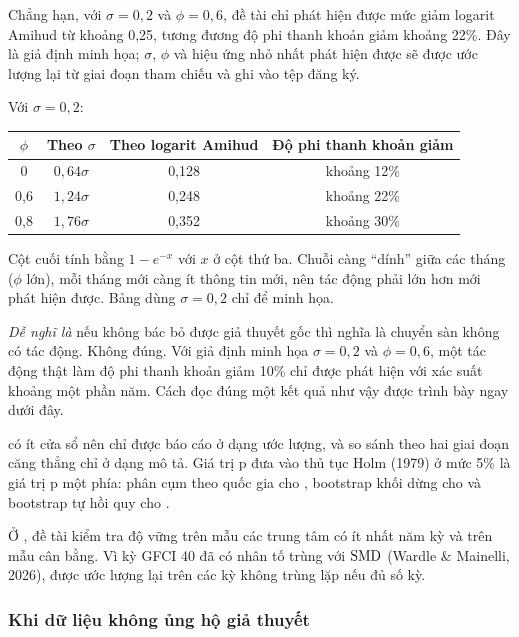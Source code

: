 Chẳng hạn, với $\sigma = 0{,}2$ và $\phi = 0{,}6$, đề tài chỉ phát hiện được mức giảm logarit Amihud từ khoảng 0,25, tương đương độ phi thanh khoản giảm khoảng 22\%. Đây là giả định minh họa; $\sigma$, $\phi$ và hiệu ứng nhỏ nhất phát hiện được sẽ được ước lượng lại từ giai đoạn tham chiếu và ghi vào tệp đăng ký.

\begin{vidu}
Với $\sigma = 0{,}2$:
\begin{center}
\begin{tabular}{@{}cccc@{}}
\toprule
$\phi$ & Theo $\sigma$ & Theo logarit Amihud & Độ phi thanh khoản giảm\\
\midrule
0 & $0{,}64\sigma$ & 0,128 & khoảng 12\%\\
0,6 & $1{,}24\sigma$ & 0,248 & khoảng 22\%\\
0,8 & $1{,}76\sigma$ & 0,352 & khoảng 30\%\\
\bottomrule
\end{tabular}
\end{center}
Cột cuối tính bằng $1 - e^{-x}$ với $x$ ở cột thứ ba. Chuỗi càng \enquote{dính} giữa các tháng ($\phi$ lớn), mỗi tháng mới càng ít thông tin mới, nên tác động phải lớn hơn mới phát hiện được. Bảng dùng $\sigma = 0{,}2$ chỉ để minh họa.
\end{vidu}

\begin{delam}
\emph{Dễ nghĩ là} nếu không bác bỏ được giả thuyết gốc thì nghĩa là chuyển sàn không có tác động. Không đúng. Với giả định minh họa $\sigma = 0{,}2$ và $\phi = 0{,}6$, một tác động thật làm độ phi thanh khoản giảm 10\% chỉ được phát hiện với xác suất khoảng một phần năm. Cách đọc đúng một kết quả như vậy được trình bày ngay dưới đây.
\end{delam}

 có ít cửa sổ nên chỉ được báo cáo ở dạng ước lượng, và so sánh theo hai giai đoạn căng thẳng chỉ ở dạng mô tả. Giá trị p đưa vào thủ tục Holm (1979) ở mức 5\% là giá trị p một phía: phân cụm theo quốc gia cho , bootstrap khối dừng cho  và bootstrap tự hồi quy cho .

Ở , đề tài kiểm tra độ vững trên mẫu các trung tâm có ít nhất năm kỳ và trên mẫu cân bằng. Vì kỳ GFCI 40 đã có nhân tố trùng với $\mathrm{SMD}$ (Wardle \& Mainelli, 2026),  được ước lượng lại trên các kỳ không trùng lặp nếu đủ số kỳ.

\subsubsection*{Khi dữ liệu không ủng hộ giả thuyết}

